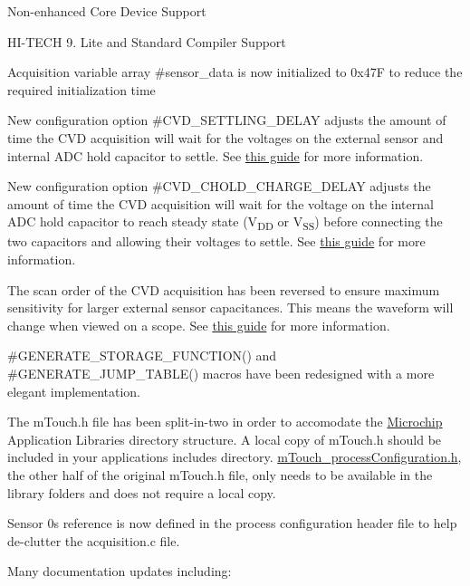 \begin{DoxyItemize}
\item Non-\/enhanced Core Device Support \item H\+I-\/\+T\+E\+C\+H 9. Lite and Standard Compiler Support \item Acquisition variable array \#sensor\+\_\+data is now initialized to 0x47\+F to reduce the required initialization time \item New configuration option \#\+C\+V\+D\+\_\+\+S\+E\+T\+T\+L\+I\+N\+G\+\_\+\+D\+E\+L\+A\+Y adjusts the amount of time the C\+V\+D acquisition will wait for the voltages on the external sensor and internal A\+D\+C hold capacitor to settle. See \hyperlink{ts-Waveform}{this guide} for more information. \item New configuration option \#\+C\+V\+D\+\_\+\+C\+H\+O\+L\+D\+\_\+\+C\+H\+A\+R\+G\+E\+\_\+\+D\+E\+L\+A\+Y adjusts the amount of time the C\+V\+D acquisition will wait for the voltage on the internal A\+D\+C hold capacitor to reach steady state (V\textsubscript{D\+D} or V\textsubscript{S\+S}) before connecting the two capacitors and allowing their voltages to settle. See \hyperlink{ts-Waveform}{this guide} for more information. \item The scan order of the C\+V\+D acquisition has been reversed to ensure maximum sensitivity for larger external sensor capacitances. This means the waveform will change when viewed on a scope. See \hyperlink{ts-Waveform}{this guide} for more information. \item \#\+G\+E\+N\+E\+R\+A\+T\+E\+\_\+\+S\+T\+O\+R\+A\+G\+E\+\_\+\+F\+U\+N\+C\+T\+I\+O\+N() and \#\+G\+E\+N\+E\+R\+A\+T\+E\+\_\+\+J\+U\+M\+P\+\_\+\+T\+A\+B\+L\+E() macros have been redesigned with a more elegant implementation. \item The m\+Touch.\+h file has been split-\/in-\/two in order to accomodate the \hyperlink{namespace_microchip}{Microchip} Application Libraries\textquotesingle{} directory structure. A local copy of m\+Touch.\+h should be included in your application\textquotesingle{}s includes directory. \hyperlink{m_touch__process_configuration_8h}{m\+Touch\+\_\+process\+Configuration.\+h}, the other half of the original m\+Touch.\+h file, only needs to be available in the library folders and does not require a local copy. \item Sensor 0\textquotesingle{}s reference is now defined in the process configuration header file to help de-\/clutter the acquisition.\+c file. \item Many documentation updates including\+: 

\end{DoxyItemize}
